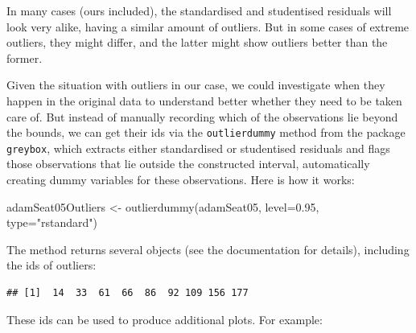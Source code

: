 \documentclass[
]{book}
\newenvironment{Shaded}{\begin{snugshade}}{\end{snugshade}}
\newcommand{\AttributeTok}[1]{\textcolor[rgb]{0.77,0.63,0.00}{#1}}
\newcommand{\FloatTok}[1]{\textcolor[rgb]{0.00,0.00,0.81}{#1}}
\newcommand{\FunctionTok}[1]{\textcolor[rgb]{0.00,0.00,0.00}{#1}}
\newcommand{\NormalTok}[1]{#1}
\newcommand{\OtherTok}[1]{\textcolor[rgb]{0.56,0.35,0.01}{#1}}
\newcommand{\SpecialCharTok}[1]{\textcolor[rgb]{0.00,0.00,0.00}{#1}}
\newcommand{\StringTok}[1]{\textcolor[rgb]{0.31,0.60,0.02}{#1}}
\theoremstyle{definition}
\theoremstyle{definition}
\theoremstyle{definition}
\theoremstyle{definition}
\theoremstyle{remark}
\begin{document}
In many cases (ours included), the standardised and studentised residuals will look very alike, having a similar amount of outliers. But in some cases of extreme outliers, they might differ, and the latter might show outliers better than the former.

Given the situation with outliers in our case, we could investigate when they happen in the original data to understand better whether they need to be taken care of. But instead of manually recording which of the observations lie beyond the bounds, we can get their ids via the \texttt{outlierdummy} method from the package \texttt{greybox}, which extracts either standardised or studentised residuals and flags those observations that lie outside the constructed interval, automatically creating dummy variables for these observations. Here is how it works:

\begin{Shaded}
\begin{Highlighting}[]
\NormalTok{adamSeat05Outliers }\OtherTok{\textless{}{-}}
  \FunctionTok{outlierdummy}\NormalTok{(adamSeat05,}
               \AttributeTok{level=}\FloatTok{0.95}\NormalTok{, }\AttributeTok{type=}\StringTok{"rstandard"}\NormalTok{)}
\end{Highlighting}
\end{Shaded}

The method returns several objects (see the documentation for details), including the ids of outliers:

\begin{Shaded}
\end{Shaded}

\begin{verbatim}
## [1]  14  33  61  66  86  92 109 156 177
\end{verbatim}

These ids can be used to produce additional plots. For example:
\end{document}
